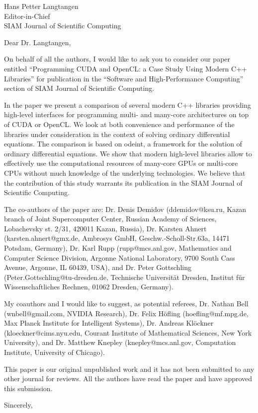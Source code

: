\documentclass[a4paper,11pt]{letter}
\begin{document}
\begin{letter}{
    Hans Petter Langtangen\\
    Editor-in-Chief\\
    SIAM Journal of Scientific Computing
    }
\opening{Dear Dr. Langtangen,}

On behalf of all the authors, I would like to ask you to consider our paper
entitled ``Programming CUDA and OpenCL: a Case Study Using Modern C++
Libraries'' for publication in the ``Software and High-Performance Computing''
section of SIAM Journal of Scientific Computing.

In the paper we present a comparison of several modern C++ libraries providing
high-level interfaces for programming multi- and many-core architectures on top
of CUDA or OpenCL.  We look at both convenience and performance of the
libraries under consideration in the context of solving ordinary differential
equations. The comparison is based on odeint, a framework for the solution of
ordinary differential equations. We show that modern high-level libraries allow
to effectively use the computational resources of many-core GPUs or multi-core
CPUs without much knowledge of the underlying technologies. We believe that the
contribution of this study warrants its publication in the SIAM Journal of
Scientific Computing.

The co-authors of the paper are: Dr. Denis Demidov (ddemidov@ksu.ru, Kazan
branch of Joint Supercomputer Center, Russian Academy of Sciences, Lobachevsky
st. 2/31, 420011 Kazan, Russia), Dr. Karsten Ahnert (karsten.ahnert@gmx.de,
Ambrosys GmbH, Geschw.-Scholl-Str.63a, 14471 Potsdam, Germany), Dr. Karl Rupp
(rupp@mcs.anl.gov, Mathematics and Computer Science Division, Argonne National
Laboratory, 9700 South Cass Avenue, Argonne, IL 60439, USA), and Dr. Peter
Gottschling (Peter.Gottschling@tu-dresden.de, Technische Universit\"at Dresden,
Institut f\"ur Wissenschaftliches Rechnen, 01062 Dresden, Germany).

My coauthors and I would like to suggest, as potential referees, Dr. Nathan
Bell (wnbell@gmail.com, NVIDIA Research), Dr. Felix H\"ofling
(hoefling@mf.mpg.de, Max Planck Institute for Intelligent Systems), Dr. Andreas
Kl\"ockner (kloeckner@cims.nyu.edu, Courant Institute of Mathematical Sciences,
New York University), and Dr. Matthew Knepley (knepley@mcs.anl.gov, Computation
Institute, University of Chicago).

This paper is our original unpublished work and it has not been submitted to
any other journal for reviews. All the authors have read the paper and have
approved this submission.

\closing{Sincerely,}

\end{letter}
\end{document}
